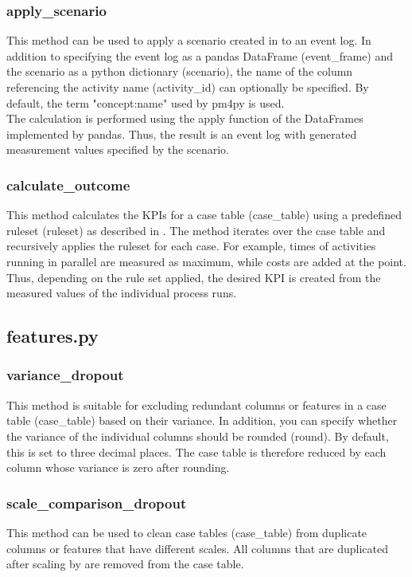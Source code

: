     \subsubsection*{apply\_scenario}
    This method can be used to apply a scenario created in  to an event log. In addition to specifying the event log as a pandas DataFrame (event\_frame) and the scenario as a python dictionary (scenario), the name of the column referencing the activity name (activity\_id) can optionally be specified. By default, the term "concept:name" used by pm4py is used.\\
    The calculation is performed using the apply function of the DataFrames implemented by pandas. Thus, the result is an event log with generated measurement values specified by the scenario.\label{apply}
    \subsubsection*{calculate\_outcome}
    This method calculates the KPIs for a case table (case\_table) using a predefined ruleset (ruleset) as described in . The method iterates over the case table and recursively applies the ruleset for each case. For example, times of activities running in parallel are measured as maximum, while costs are added at the point. Thus, depending on the rule set applied, the desired KPI is created from the measured values of the individual process runs.\label{outcome}

    \subsection{features.py}
    \subsubsection*{variance\_dropout}
    This method is suitable for excluding redundant columns or features in a case table (case\_table) based on their variance. In addition, you can specify whether the variance of the individual columns should be rounded (round). By default, this is set to three decimal places. The case table is therefore reduced by each column whose variance is zero after rounding.\label{varout}
    \subsubsection*{scale\_comparison\_dropout}
    This method can be used to clean case tables (case\_table) from duplicate columns or features that have different scales. All columns that are duplicated after scaling by  are removed from the case table.\label{scalout}
